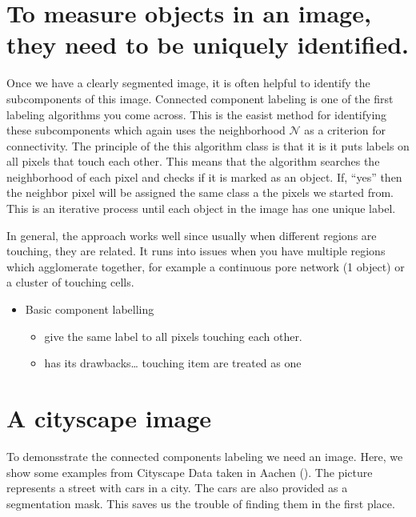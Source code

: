 \documentclass[letterpaper,10pt,english]{sphinxmanual}
\begin{document}
\section{To measure objects in an image, they need to be uniquely identified.}
\label{\detokenize{06-ShapeAnalysis:to-measure-objects-in-an-image-they-need-to-be-uniquely-identified}}
\sphinxAtStartPar
Once we have a clearly segmented image, it is often helpful to identify the sub\sphinxhyphen{}components of this image. Connected component labeling is one of the first labeling algorithms you come across. This is the easist method for identifying these subcomponents which again uses the neighborhood \(\mathcal{N}\) as a criterion for connectivity. The principle of the this algorithm class is that it is it puts labels on all pixels that touch each other. This means that the algorithm searches the neighborhood of each pixel and checks if it is marked as an object. If, “yes” then the neighbor pixel will be assigned the same class a the pixels we started from. This is an iterative process until each object in the image has one unique label.

\sphinxAtStartPar
In general, the approach works well since usually when different regions are touching, they are related. It runs into issues when you have multiple regions which agglomerate together, for example a continuous pore network (1 object) or a cluster of touching cells.
\begin{itemize}
\item {} 
\sphinxAtStartPar
Basic component labelling
\begin{itemize}
\item {} 
\sphinxAtStartPar
give the same label to all pixels touching each other.

\item {} 
\sphinxAtStartPar
has its drawbacks… touching item are treated as one

\end{itemize}

\end{itemize}


\section{A cityscape image}
\label{\detokenize{06-ShapeAnalysis:a-cityscape-image}}
\sphinxAtStartPar
To demonsstrate the connected components labeling we need an image. Here, we show some examples from Cityscape Data taken in Aachen (). The picture represents a street with cars in a city. The cars are also provided as a segmentation mask. This saves us the trouble of finding them in the first place.
\end{document}
